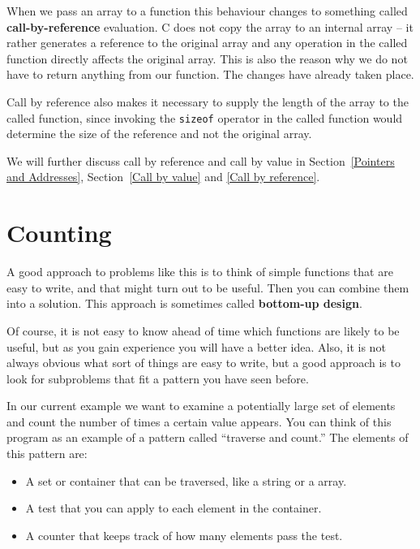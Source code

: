 When we pass an array to a function this behaviour changes to
something called {\bf call-by-reference} evaluation.
C does not copy the array to an internal array --  it rather generates a
reference to the original array and any operation in the called function 
directly affects the original array.
This is also the reason why we do not have to return anything from our 
function. The changes have already taken place. 

Call by reference also makes it necessary to supply the length of
the array to the called function, since invoking  the {\tt sizeof}
operator in the called function would determine the size of the reference
and not the original array.

We will further discuss call by reference and call by value in 
Section~\ref{Pointers and Addresses}, Section~\ref{Call by value} and
\ref{Call by reference}.

\section{Counting}
\label{counting}

A good approach to problems like this is to think of simple functions
that are easy to write, and that might turn out to be useful.  Then
you can combine them into a solution.  This approach is sometimes
called {\bf bottom-up design}.  

Of course, it is not easy to
know ahead of time which functions are likely to be useful, but as you
gain experience you will have a better idea.
Also, it is not always obvious what sort of things are easy to write,
but a good approach is to look for subproblems that fit a pattern you
have seen before.


In our current example we want to examine a potentially large set
of elements and count the number of times a certain value appears.
You
can think of this program as an example of a pattern called ``traverse
and count.''  The elements of this pattern are:

\begin{itemize}

\item A set or container that can be traversed, like a string
or a array.

\item A test that you can apply to each element in the container.

\item A counter that keeps track of how many elements pass
the test.

\end{itemize}

